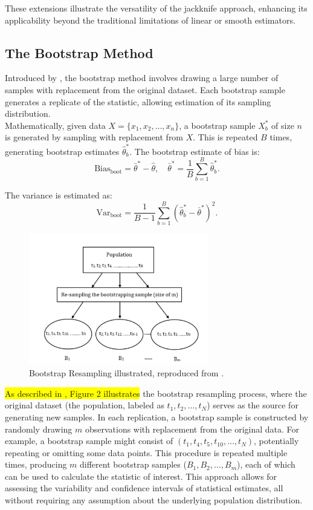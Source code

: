 \documentclass[aodsor,preprint]{imsart}
\numberwithin{equation}{section}
\theoremstyle{plain}
\begin{document}
These extensions illustrate the versatility of the jackknife approach, enhancing its applicability beyond the traditional limitations of linear or smooth estimators.

\subsection{The Bootstrap Method}

Introduced by \cite{efron1979}, the bootstrap method involves drawing a large number of samples with replacement from the original dataset. Each bootstrap sample generates a replicate of the statistic, allowing estimation of its sampling distribution. \\

Mathematically, given data \( X = \{x_1, x_2, \dots, x_n\} \), a bootstrap sample \( X^*_b \) of size \( n \) is generated by sampling with replacement from \( X \). This is repeated \( B \) times, generating bootstrap estimates \( \hat{\theta}_b^* \). The bootstrap estimate of bias is:
\[
\text{Bias}_{\text{boot}} = \bar{\theta}^* - \hat{\theta}, \quad \bar{\theta}^* = \frac{1}{B} \sum_{b=1}^{B} \hat{\theta}_b^*.
\]

The variance is estimated as:
\[
\text{Var}_{\text{boot}} = \frac{1}{B - 1} \sum_{b=1}^{B}(\hat{\theta}_b^* - \bar{\theta}^*)^2.
\]


\begin{figure}[h!]
\centering
\includegraphics[width=0.7\textwidth]{Screenshot 2025-05-04 at 19.59.04} 
\caption{Bootstrap Resampling illustrated, reproduced from \cite{Rahmanphdthesis}.}
\label{fig:jackknife-sd}
\end{figure}

\colorbox{yellow}{As described in \cite{Rahmanphdthesis}, Figure 2 illustrates} the bootstrap resampling process, where the original dataset (the population, labeled as $t_1, t_2, ..., t_N$) serves as the source for generating new samples. In each replication, a bootstrap sample is constructed by randomly drawing $m$ observations with replacement from the original data. For example, a bootstrap sample might consist of $(t_1, t_4, t_5, t_{10}, \ldots, t_N)$, potentially repeating or omitting some data points. This procedure is repeated multiple times, producing $m$ different bootstrap samples ($B_1, B_2, \ldots, B_m$), each of which can be used to calculate the statistic of interest. This approach allows for assessing the variability and confidence intervals of statistical estimates, all without requiring any assumption about the underlying population distribution. 
\end{document}
